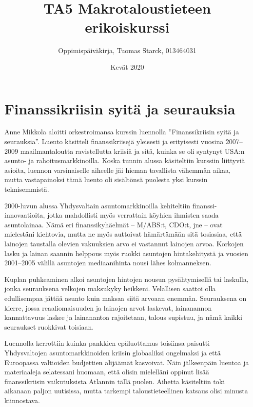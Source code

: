 \documentclass[12pt]{article}
\begin{document}
\title{TA5 Makrotaloustieteen erikoiskurssi}
\author{Oppimispäiväkirja, Tuomas Starck, 013464031}
\date{Kevät 2020}
\maketitle

\newpage
\section{Finanssikriisin syitä ja seurauksia}

Anne Mikkola aloitti orkestroimansa kurssin luennolla ''Finanssikriisin syitä ja seurauksia''. Luento käsitteli finanssikriisejä yleisesti ja erityisesti vuosina 2007–2009 maailmantaloutta ravistellutta kriisiä ja sitä, kuinka se oli syntynyt USA:n asunto- ja rahoitusmarkkinoilla. Koska tunnin alussa käsiteltiin kurssiin liittyviä asioita, luennon varsinaiselle aiheelle jäi hieman tavallista vähemmän aikaa, mutta vastapainoksi tämä luento oli sisältönsä puolesta yksi kurssin teknisemmistä.

2000-luvun alussa Yhdysvaltain asuntomarkkinoilla kehiteltiin finanssi-innovaatioita, jotka mahdollisti myös verrattain köyhien ihmisten saada asuntolainaa. Nämä eri finanssikyhäelmät – M/ABS:t, CDO:t, jne – ovat mielestäni kiehtovia, mutta ne myös auttoivat hämärtämään sitä tosiasiaa, että lainojen taustalla olevien vakuuksien arvo ei vastannut lainojen arvoa. Korkojen lasku ja lainan saannin helppous myös ruokki asuntojen hintakehitystä ja vuosien 2001–2005 välillä asuntojen mediaanihinta nousi lähes kolmanneksen.

Kuplan puhkeaminen alkoi asuntojen hintojen nousun pysähtymisellä tai laskulla, jonka seurauksena velkojen maksukyky heikkeni. Velallisen saattoi olla edullisempaa jättää asunto kuin maksaa siitä arvoaan enemmän. Seurauksena on kierre, jossa reaaliomaisuuden ja lainojen arvot laskevat, lainanannon kannattavuus laskee ja lainanantoa rajoitetaan, talous supistuu, ja nämä kaikki seuraukset ruokkivat toisiaan.

Luennolla kerrottiin kuinka pankkien epäluottamus toisiinsa paisutti Yhdysvaltojen asuntomarkkinoiden kriisin globaaliksi ongelmaksi ja että Euroopassa valtioiden budjettien alijäämät kasvoivat. Näin jälkeenpäin luentoa ja materiaaleja selatessani huomaan, että olisin mielelläni oppinut lisää finanssikriisin vaikutuksista Atlannin tällä puolen. Aihetta käsiteltiin toki aikanaan paljon uutisissa, mutta tarkempi taloustieteellinen katsaus olisi minusta kiinnostava.
\end{document}
